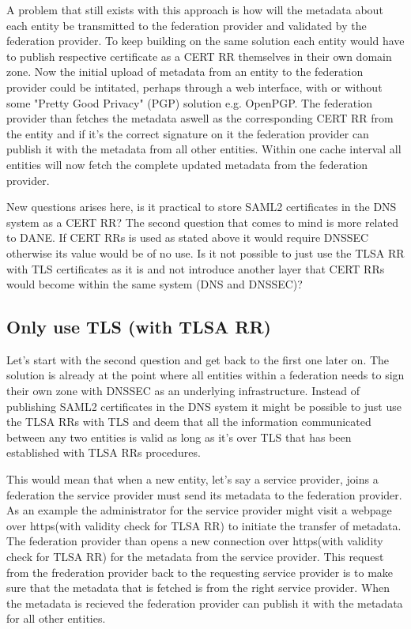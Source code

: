 A problem that still exists with this approach is how will the metadata about each entity be transmitted to the federation provider and validated by the federation provider.
To keep building on the same solution each entity would have to publish respective certificate as a CERT RR themselves in their own domain zone.
Now the initial upload of metadata from an entity to the federation provider could be intitated, perhaps through a web interface, with or without some "Pretty Good Privacy" (PGP) solution e.g. OpenPGP\cite{rfc:2440}.
The federation provider than fetches the metadata aswell as the corresponding CERT RR from the entity and if it's the correct signature on it the federation provider can publish it with the metadata from all other entities.
Within one cache interval all entities will now fetch the complete updated metadata from the federation provider.


New questions arises here, is it practical to store SAML2 certificates in the DNS system as a CERT RR?
The second question that comes to mind is more related to DANE.
If CERT RRs is used as stated above it would require DNSSEC otherwise its value would be of no use.
Is it not possible to just use the TLSA RR with TLS certificates as it is and not introduce another layer that CERT RRs would become within the same system (DNS and DNSSEC)?

\subsection{Only use TLS (with TLSA RR)}
\label{subsec:only-tlsa-rr-with-tls}
Let's start with the second question and get back to the first one later on.
The solution is already at the point where all entities within a federation needs to sign their own zone with DNSSEC as an underlying infrastructure.
Instead of publishing SAML2 certificates in the DNS system it might be possible to just use the TLSA RRs with TLS and deem that all the information communicated between any two entities is valid as long as it's over TLS that has been established with TLSA RRs procedures.

This would mean that when a new entity, let's say a service provider, joins a federation the service provider must send its metadata to the federation provider.
As an example the administrator for the service provider might visit a webpage over https(with validity check for TLSA RR) to initiate the transfer of metadata.
The federation provider than opens a new connection over https(with validity check for TLSA RR) for the metadata from the service provider.
This request from the frederation provider back to the requesting service provider is to make sure that the metadata that is fetched is from the right service provider. 
When the metadata is recieved the federation provider can publish it with the metadata for all other entities.

